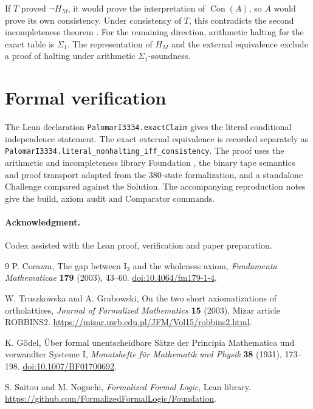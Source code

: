 \documentclass[11pt,letterpaper]{article}
\newcommand{\Con}{\operatorname{Con}}
\newcommand{\code}[1]{\texttt{\nolinkurl{#1}}}
\begin{document}
If $T$ proved $\neg H_M$, it would prove the interpretation of
$\Con(A)$, so $A$ would prove its own consistency. Under consistency
of $T$, this contradicts the second incompleteness theorem
\cite{goedel}. For the remaining direction, arithmetic halting for
the exact table is $\Sigma_1$. The representation of $H_M$ and the
external equivalence exclude a proof of halting under arithmetic
$\Sigma_1$-soundness.

\section{Formal verification}

The Lean declaration \code{PalomarI3334.exactClaim} gives the literal
conditional independence statement. The exact external equivalence
is recorded separately as
\code{PalomarI3334.literal_nonhalting_iff_consistency}.
The proof uses the arithmetic and incompleteness library Foundation
\cite{foundation}, the binary tape semantics and proof transport adapted from
the 380-state formalization, and a standalone Challenge
compared against the Solution. The accompanying reproduction notes
give the build, axiom audit and Comparator commands.

\paragraph{Acknowledgment.}
Codex assisted with the Lean proof, verification and paper preparation.

\begin{thebibliography}{9}
P. Corazza, The gap between $\mathrm I_3$ and the wholeness axiom,
\emph{Fundamenta Mathematicae} \textbf{179} (2003), 43--60.
\href{https://doi.org/10.4064/fm179-1-4}{doi:10.4064/fm179-1-4}.

W. Truszkowska and A. Grabowski, On the two short axiomatizations of
ortholattices, \emph{Journal of Formalized Mathematics} \textbf{15}
(2003), Mizar article ROBBINS2.
\url{https://mizar.uwb.edu.pl/JFM/Vol15/robbins2.html}.

K. G\"odel, \"Uber formal unentscheidbare S\"atze der Principia
Mathematica und verwandter Systeme I, \emph{Monatshefte f\"ur
Mathematik und Physik} \textbf{38} (1931), 173--198.
\href{https://doi.org/10.1007/BF01700692}{doi:10.1007/BF01700692}.

S. Saitou and M. Noguchi, \emph{Formalized Formal Logic}, Lean library.
\url{https://github.com/FormalizedFormalLogic/Foundation}.
\end{thebibliography}
\end{document}
